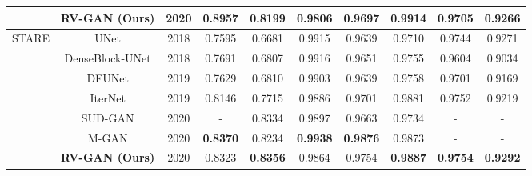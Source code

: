 \documentclass[runningheads]{llncs}
\begin{document}
\begin{table}[t!]
\begin{adjustbox}{width=1\textwidth}
\begin{tabular}{c|c|c|c|c|c|c|c|c|c}
& \textbf{RV-GAN (Ours)} & 2020 & \textbf{0.8957} & \textbf{0.8199} & 0.9806 & 0.9697 & \textbf{0.9914} & \textbf{0.9705} & \textbf{0.9266}  \\\hline
\multirow{7}{*}{STARE}& UNet \cite{jin2019dunet} & 2018 & 0.7595 & 0.6681 & 0.9915 & 0.9639 & 0.9710 & 0.9744 & 0.9271\\
& DenseBlock-UNet \cite{li2018h}  & 2018  & 0.7691 & 0.6807 & 0.9916 & 0.9651 & 0.9755 & 0.9604 & 0.9034 \\ 
& DFUNet \cite{jin2019dunet} & 2019 & 0.7629 & 0.6810 & 0.9903 & 0.9639 & 0.9758 & 0.9701 &  0.9169      \\
& IterNet \cite{li2020iternet} & 2019 & 0.8146 & 0.7715 & 0.9886 & 0.9701 & 0.9881 & 0.9752 & 0.9219\\
& SUD-GAN \cite{yang2020sud}& 2020 & - & 0.8334 & 0.9897 & 0.9663 & 0.9734 & - & - \\
& M-GAN \cite{park2020m} & 2020 & \textbf{0.8370} & 0.8234 & \textbf{0.9938} & \textbf{0.9876} & 0.9873 & - & - \\
& \textbf{RV-GAN (Ours)} & 2020 & 0.8323 & \textbf{0.8356} & 0.9864 & 0.9754 & \textbf{0.9887} & \textbf{0.9754} & \textbf{0.9292}  \\\hline	
\end{tabular}
\label{table1}
\end{adjustbox}
\end{table}
\end{document}
